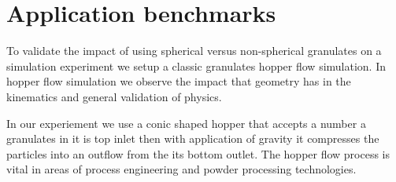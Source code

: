 \section{Application benchmarks}
\label{section:benchmarks}

\label{section:hopper}
To validate the impact of using spherical versus non-spherical granulates on a simulation experiment we setup a classic granulates hopper flow simulation. In hopper flow simulation we observe the impact that geometry has in the kinematics and general validation of physics.

In our experiement we use a conic shaped hopper that accepts a number a granulates in it is top inlet then with application of gravity it compresses the particles into an outflow from the its bottom outlet. The hopper flow process is vital in areas of process engineering and powder processing technologies.    